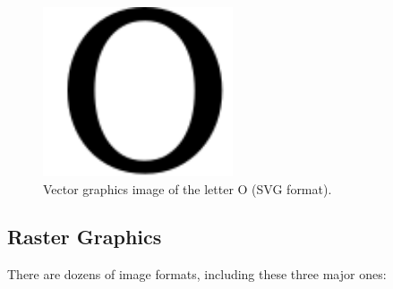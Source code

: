 \documentclass[
  11pt,
  british,
  a4paper,
]{article}
\begin{document}
\begin{figure}
\hypertarget{fig:vector}{%
\centering
\includegraphics[width=0.5\textwidth,height=\textheight]{images/letter-O.svg}
\caption{Vector graphics image of the letter O (SVG
format).}\label{fig:vector}
}
\end{figure}

\hypertarget{raster-graphics}{%
\subsection{Raster Graphics}\label{raster-graphics}}

There are dozens of image formats, including these three major ones:
\end{document}
